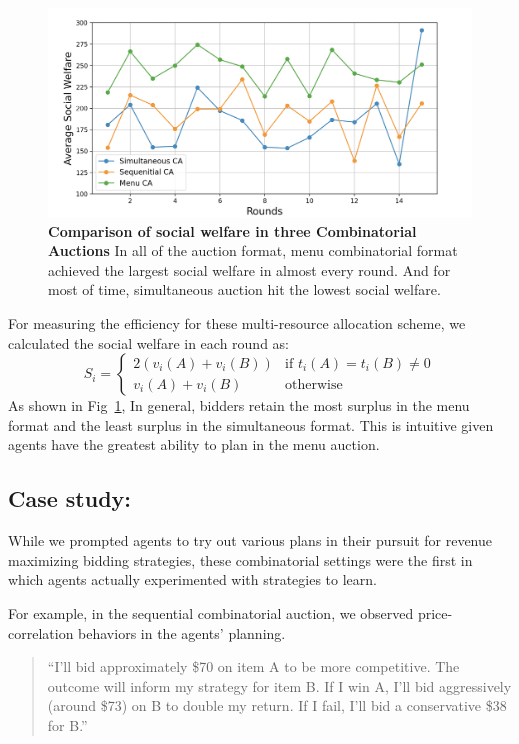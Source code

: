 \documentclass{article} %
\begin{document}
\begin{figure}[h]
    \centering \includegraphics[width=0.9\linewidth]{Figs/social_welfare.png}
    \caption{\textbf{Comparison of social welfare in three Combinatorial Auctions} In all of the auction format, menu combinatorial format achieved the largest social welfare in almost every round. And for most of time, simultaneous auction hit the lowest social welfare.}
    \label{fig:social}
\end{figure}

For measuring the efficiency for these multi-resource allocation scheme, we calculated the social welfare in each round as:
\begin{equation}
   S_i = 
   \begin{cases}
      2 \left( v_i(A) + v_i(B) \right) & \text{if } t_i(A) = t_i(B) \neq 0\\
      v_i(A) + v_i(B) & \text{otherwise}
   \end{cases}
\end{equation}
As shown in Fig~\ref{fig:social}, In general, bidders retain the most surplus in the menu format and the least surplus in the simultaneous format. This is intuitive given agents have the greatest ability to plan in the menu auction.


\subsection{Case study:}
While we prompted agents to try out various plans in their pursuit for revenue maximizing bidding strategies, these combinatorial settings were the first in which agents actually experimented with strategies to learn. 

For example, in the sequential combinatorial auction, we observed price-correlation behaviors in the agents' planning.
\begin{quote}
    ``I'll bid approximately \$70 on item A to be more competitive. The outcome will inform my strategy for item B. If I win A, I'll bid aggressively (around \$73) on B to double my return. If I fail, I'll bid a conservative \$38 for B.''
\end{quote}
\end{document}

